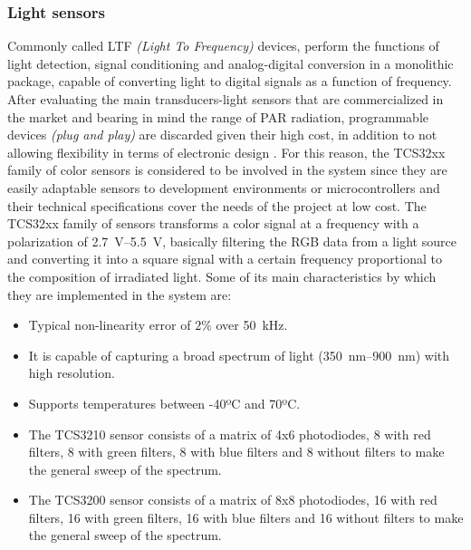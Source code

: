 \documentclass[letterpaper,12pt,twoside]{articleingud}
\begin{document}
\subsubsection{Light sensors}
Commonly called LTF \textit{(Light To Frequency)} devices, perform the functions of light detection, signal conditioning and analog-digital conversion in a monolithic package, capable of converting light to digital signals as a function of frequency. After evaluating the main transducers-light sensors that are commercialized in the market and bearing in mind the range of PAR radiation, programmable devices \textit{(plug and play)} are discarded given their high cost, in addition to not allowing flexibility in terms of electronic design . For this reason, the TCS32xx family of color sensors is considered to be involved in the system since they are easily adaptable sensors to development environments or microcontrollers and their technical specifications cover the needs of the project at low cost. The TCS32xx family of sensors transforms a color signal at a frequency with a polarization of \SIrange{2.7}{5.5}{\volt}, basically filtering the RGB data from a light source and converting it into a square signal with a certain frequency proportional to the composition of irradiated light. Some of its main characteristics by which they are implemented in the system are:
\begin{itemize}
    \item Typical non-linearity error of $2\%$ over \SI{50}{\kilo\hertz}.
    \item It is capable of capturing a broad spectrum of light (\SIrange{350}{900}{\nano\metre}) with high resolution.
    \item Supports temperatures between -40ºC and 70ºC.
    \item The TCS3210 sensor consists of a matrix of 4x6 photodiodes, 8 with red filters, 8 with green filters, 8 with blue filters and 8 without filters to make the general sweep of the spectrum.
    \item The TCS3200 sensor consists of a matrix of 8x8 photodiodes, 16 with red filters, 16 with green filters, 16 with blue filters and 16 without filters to make the general sweep of the spectrum.
\end{itemize}
\end{document}

